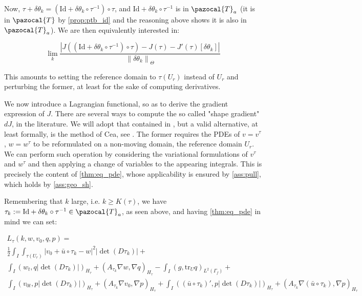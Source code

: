\documentclass[english,a4paper,9pt,oneside]{scrbook}	%
\theoremstyle{break}
\theoremstyle{remark}
\newcommand{\norm}[1]{\left\lVert#1\right\rVert}
\newcommand{\tr}{\text{tr}}
\newcommand{\cT}{\pazocal{T}}
\newcommand{\id}{\text{Id}}
\newcommand{\te}{\theta}
\newcommand{\Te}{\Theta}
\begin{document}

Now, $\tau+\delta \te_k  = (\id+\delta\te_k \circ \tau^{-1})\circ \tau$, and $\id+\delta\te_k \circ \tau^{-1}$ is in $\cT_a$ (it is in $\cT$ by \cref{prop:ptb_id} and the reasoning above shows it is also in $\cT_a$). We are then equivalently interested in:

$$\lim_{k}\frac{|J((\id+\delta\te_k \circ \tau^{-1})\circ \tau)-J(\tau)-J'(\tau)[\delta \te_k]|}{\norm{\delta \te_k}_{\Te}}$$

This amounts to setting the reference domain to $\tau(U_r)$ instead of $U_r$ and perturbing the former, at least for the sake of computing derivatives.

We now introduce a Lagrangian functional, so as to derive the gradient expression of $J$. There are several ways to compute the so called "shape gradient" $dJ$, in the literature. We will adopt that contained in \cite{avg_adj}, but a valid alternative, at least formally, is the method of Cea, see \cite{cea}. The former requires the PDEs of $v=v^\tau$, $w=w^\tau$ to be reformulated on a non-moving domain, the reference domain $U_r$. We can perform such operation by considering the variational formulations of $v^\tau$ and $w^\tau$ and then applying a change of variables to the appearing integrals. This is precisely the content of \cref{thm:eq_pde}, whose applicability is ensured by \cref{ass:pull}, which holds by \cref{ass:geo_sh}.

Remembering that $k$ large, i.e. $k\geq K(\tau)$, we have $\tau_k:=\id+\delta\te_k \circ \tau^{-1} \in \cT_a$, as seen above, and  having \cref{thm:eq_pde} in mind we can set:

\begin{align*}
L_\tau(k,w,v_0,q,p) = \\
\frac{1}{2}\int_I \int_{\tau(U_r)}|v_0+\bar{u} \circ \tau_k - w|^2|\det(D\tau_k)|+\\
\int_I ( w_t , q |\det(D\tau_k)|)_{H_\tau}+ (A_{\tau_k}\nabla w, \nabla q)_{H_\tau} -\int_I(g,\tr_{U} q)_{L^2(\Gamma_f)} +\\ \int_I (v_{0t},p |\det(D\tau_k)|)_{H_\tau} + (A_{\tau_k} \nabla v_0, \nabla p)_{H_\tau}+\int_I((\bar{u}\circ \tau_k)',p|\det(D\tau_k)|)_{H_\tau}+(A_{\tau_k} \nabla (\bar{u} \circ \tau_k), \nabla p)_{H_\tau}
\end{align*}
\end{document}
